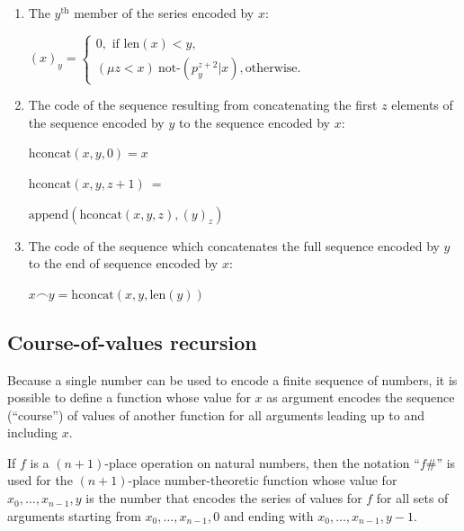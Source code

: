 \documentclass[12pt]{report}
\theoremstyle{nonumberplain}
\begin{document}
\begin{enumerate}[label=(\alph*),itemsep=0.5ex]
\item The $y^{\text{th}}$ member of the series encoded by $x$:

$(x)_y = \begin{cases}
0,\text{ if $\mathrm{len}(x) < y$,}\\
(μz < x)\ \text{not-}(p_y^{z+2} | x), \text{otherwise.}
\end{cases}$

\item The code of the sequence resulting from concatenating the first $z$ elements of the sequence encoded by $y$ to the sequence encoded by $x$:

$\mathrm{hconcat}(x,y,0) = x$

$\mathrm{hconcat}(x,y,z+1)\ = $

\hfill$\mathrm{append}(\mathrm{hconcat}(x,y,z),(y)_z)$

\item The code of the sequence which concatenates the full sequence encoded by $y$ to the end of sequence encoded by $x$:

$x \smallfrown y = \mathrm{hconcat}(x,y,\mathrm{len}(y))$


\end{enumerate}

\subsection*{Course-of-values recursion}
%
Because a single number can be used to encode a finite sequence of numbers, it is possible to define a function whose value for $x$ as argument encodes the sequence (``course'') of values of another function for all arguments leading up to and including $x$.

If $f$ is a $(n + 1)$-place operation on natural numbers, then the notation ``$f\#$'' is used for the
$(n + 1)$-place number-theoretic function whose value for $x_0, \dotsc , x_{n-1}, y$ is the number that encodes the series of values for $f$ for all sets of arguments starting from $x_0, \dotsc , x_{n-1}, 0$ and ending with $x_0, \dotsc , x_{n-1}, y - 1$.
\end{document}
